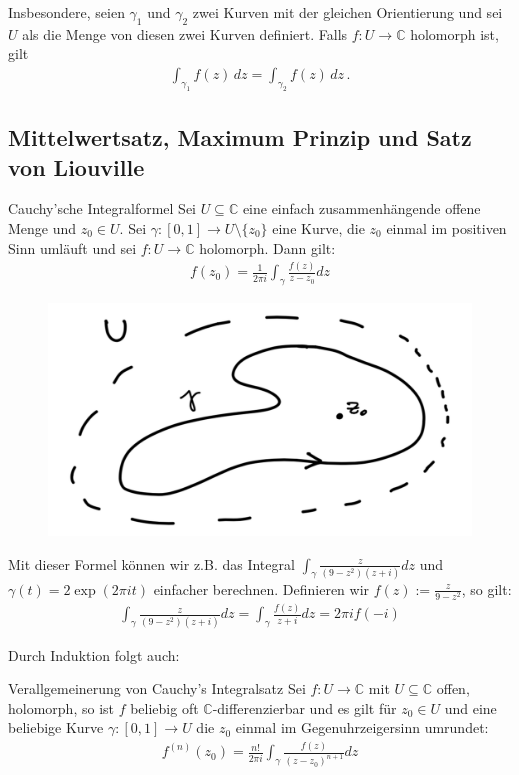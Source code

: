\documentclass[a4paper,10pt]{article}
\begin{document}
Insbesondere, seien \(\gamma_1\) und \(\gamma_2\) zwei Kurven mit der gleichen Orientierung und sei \(U\) als die Menge von diesen zwei Kurven definiert. Falls \(f\colon U\to\mathbb{C}\) holomorph ist, gilt \begin{align*} \int_{\gamma_1}f(z)\,dz=\int_{\gamma_2}f(z)\,dz\,. \end{align*}

\subsection{Mittelwertsatz, Maximum Prinzip und Satz von Liouville}

\begin{mainbox}{Cauchy'sche Integralformel}
  Sei \(U \subseteq \mathbb{C}\) eine einfach zusammenhängende offene Menge und \(z_0\in U\). Sei \(\gamma \colon [0,1] \to U \setminus \{z_0\}\) eine Kurve, die \(z_0\) einmal im positiven Sinn umläuft und sei \(f \colon U \to \mathbb{C}\) holomorph. Dann gilt:
\begin{align*}f(z_0) = \frac{1}{2\pi i} \int_{\gamma} \frac{f(z)}{z-z_0}dz \end{align*}
\begin{figure}[H]
  \centering 
  \includegraphics[width=0.6\linewidth]{assets/3-5-1.png}
\end{figure}
\end{mainbox}

Mit dieser Formel können wir z.B. das Integral $\int_\gamma \frac{z}{(9-z^2)(z+i)} dz$ und $\gamma(t) = 2\exp(2\pi it)$ einfacher berechnen. Definieren wir $f(z) := \frac{z}{9 - z^2}$, so gilt:
\begin{align*}
  \int_\gamma \frac{z}{(9-z^2)(z+i)} dz = \int_\gamma \frac{f(z)}{z + i} dz = 2\pi i f(-i)
\end{align*}

Durch Induktion folgt auch:

\begin{mainbox}{Verallgemeinerung von Cauchy's Integralsatz}
  Sei \(f \colon U \to \mathbb{C}\) mit \(U\subseteq \mathbb{C}\) offen, holomorph, so ist \(f\) beliebig oft \(\mathbb{C}\)-differenzierbar und es gilt für \(z_0\in U\) und eine beliebige Kurve \(\gamma \colon [0,1] \to U\) die \(z_0\) einmal im Gegenuhrzeigersinn umrundet: \begin{align*} f^{( n )}(z_0) = \frac{n!}{2\pi i} \int_{\gamma} \frac{f(z)}{(z-z_0)^{n+1}}dz \end{align*}
\end{mainbox}
\end{document}
